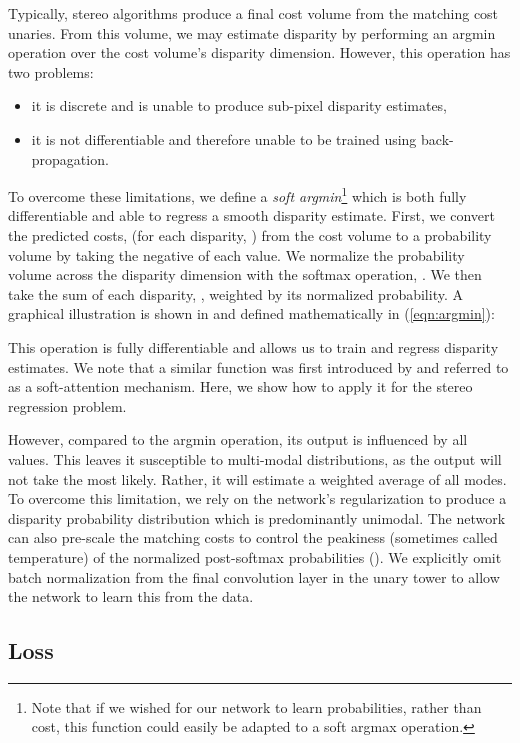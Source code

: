 \documentclass[10pt,twocolumn,letterpaper]{article}
\begin{document}
Typically, stereo algorithms produce a final cost volume from the matching cost unaries. From this volume, we may estimate disparity by performing an argmin operation over the cost volume’s disparity dimension. However, this operation has two problems:
\begin{itemize}[noitemsep]
\item it is discrete and is unable to produce sub-pixel disparity estimates,
\item it is not differentiable and therefore unable to be trained using back-propagation.
\end{itemize}
To overcome these limitations, we define a \textit{soft argmin}\footnote{Note that if we wished for our network to learn probabilities, rather than cost, this function could easily be adapted to a soft argmax operation.} which is both fully differentiable and able to regress a smooth disparity estimate. First, we convert the predicted costs,  (for each disparity, ) from the cost volume to a probability volume by taking the negative of each value. We normalize the probability volume across the disparity dimension with the softmax operation, . We then take the sum of each disparity, , weighted by its normalized probability. A graphical illustration is shown in  and defined mathematically in (\ref{eqn:argmin}):

This operation is fully differentiable and allows us to train and regress disparity estimates. We note that a similar function was first introduced by \cite{bahdanau2014neural} and referred to as a soft-attention mechanism. Here, we show how to apply it for the stereo regression problem.

However, compared to the argmin operation, its output is influenced by all values. This leaves it susceptible to multi-modal distributions, as the output will not take the most likely. Rather, it will estimate a weighted average of all modes. To overcome this limitation, we rely on the network's regularization to produce a disparity probability distribution which is predominantly unimodal. The network can also pre-scale the matching costs to control the peakiness (sometimes called temperature) of the normalized post-softmax probabilities (). We explicitly omit batch normalization from the final convolution layer in the unary tower to allow the network to learn this from the data.

\subsection{Loss}
\end{document}
